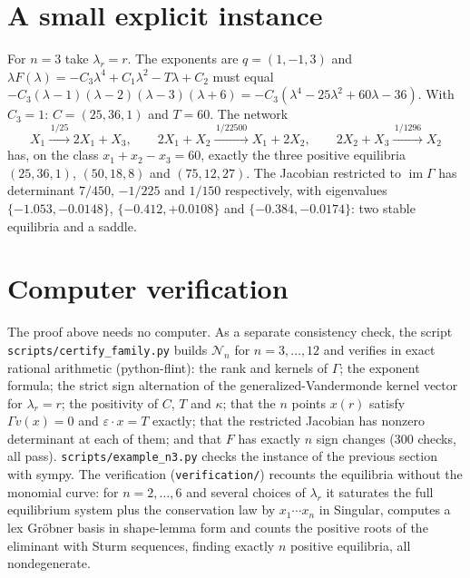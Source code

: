 \documentclass[11pt,a4paper]{report}
\newcommand{\Net}{\mathcal N}
\providecommand{\im}{\operatorname{im}}
\begin{document}
\section{A small explicit instance}

For \(n=3\) take \(\lambda_r=r\). The exponents are \(q=(1,-1,3)\) and
\(\lambda F(\lambda)=-C_3\lambda^4+C_1\lambda^2-T\lambda+C_2\) must equal
\(-C_3(\lambda-1)(\lambda-2)(\lambda-3)(\lambda+6)=-C_3(\lambda^4-25\lambda^2+60\lambda-36)\). With \(C_3=1\):
\(C=(25,36,1)\) and \(T=60\). The network
\[
X_1\xrightarrow{\,1/25\,}2X_1+X_3,\qquad 2X_1+X_2\xrightarrow{\,1/22500\,}X_1+2X_2,\qquad
2X_2+X_3\xrightarrow{\,1/1296\,}X_2
\]
has, on the class \(x_1+x_2-x_3=60\), exactly the three positive equilibria \((25,36,1)\), \((50,18,8)\) and
\((75,12,27)\). The Jacobian restricted to \(\im\Gamma\) has determinant \(7/450\), \(-1/225\) and \(1/150\)
respectively, with eigenvalues \(\{-1.053,-0.0148\}\), \(\{-0.412,+0.0108\}\) and \(\{-0.384,-0.0174\}\): two stable
equilibria and a saddle.

\section{Computer verification}

The proof above needs no computer. As a separate consistency check, the script \texttt{scripts/\allowbreak certify\_family.py} builds
\(\Net_n\) for \(n=3,\dots,12\) and verifies in exact rational arithmetic (python-flint): the rank and kernels of
\(\Gamma\); the exponent formula; the strict sign alternation of the generalized-Vandermonde kernel vector for
\(\lambda_r=r\); the positivity of \(C\), \(T\) and \(\kappa\); that the \(n\) points \(x(r)\) satisfy \(\Gamma v(x)=0\) and
\(\varepsilon\cdot x=T\) exactly; that the restricted Jacobian has nonzero determinant at each of them; and that \(F\)
has exactly \(n\) sign changes (300 checks, all pass). \texttt{scripts/example\_n3.py} checks the instance of the
previous section with sympy. The verification (\texttt{verification/}) recounts the equilibria without
the monomial curve: for \(n=2,\dots,6\) and several choices of \(\lambda_r\) it saturates the full equilibrium system
plus the conservation law by \(x_1\cdots x_n\) in Singular, computes a lex Gröbner basis in shape-lemma form and counts
the positive roots of the eliminant with Sturm sequences, finding exactly \(n\) positive equilibria, all
nondegenerate.

\paperreferences
\end{document}
